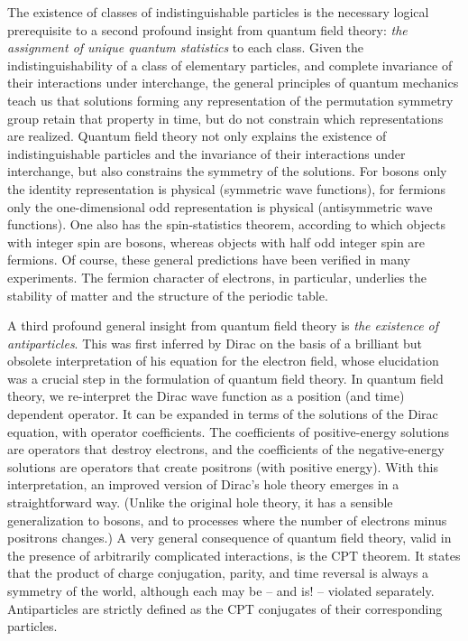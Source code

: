 \documentclass[12pt]{article}
\begin{document}
The existence of
classes of indistinguishable particles is the necessary logical
prerequisite to a second profound insight from quantum field theory:
{\it the assignment of unique quantum statistics\/} to each class.
Given the indistinguishability of a class of
elementary particles, and complete invariance of their interactions
under interchange, the general principles of quantum mechanics teach
us that solutions forming any representation of the permutation
symmetry group retain that property in time, but do not constrain
which representations are realized.  Quantum field theory not only
explains the existence of indistinguishable particles and the
invariance of their interactions under interchange, but also
constrains the symmetry of the solutions.  For bosons only the
identity representation is physical (symmetric wave functions), for
fermions only the one-dimensional odd representation is physical
(antisymmetric wave functions).  One also has the spin-statistics
theorem, according to which objects with integer spin are bosons,
whereas objects with half odd integer spin are fermions.  Of course,
these general predictions have been verified in many experiments.  The
fermion character of electrons, in particular, underlies the stability
of matter and the structure of the periodic table.  

A third profound
general insight from quantum field theory is {\it the existence of
antiparticles}.  This was first inferred by Dirac on the basis of a
brilliant but obsolete interpretation of his equation for the electron
field, whose elucidation was a crucial step in the formulation of
quantum field theory.   In quantum field theory, we re-interpret the Dirac wave
function as a position (and time) dependent operator.  It can be
expanded in terms of the solutions of the Dirac equation, with
operator coefficients.  The coefficients of positive-energy solutions
are operators that destroy electrons, and the coefficients of the
negative-energy solutions are operators that create positrons (with
positive energy).  With this interpretation, an improved version of
Dirac's hole theory 
emerges in a straightforward way. (Unlike the original hole theory,
it has
a sensible generalization to bosons, and to
processes where the number of electrons minus positrons changes.)
A very general consequence of
quantum field theory, valid in the presence of arbitrarily complicated
interactions, is the CPT theorem.  It states that the product of
charge conjugation, parity, and time reversal is always a symmetry of
the world, although each may be -- and is! -- violated separately.
Antiparticles are strictly defined as the CPT conjugates of their
corresponding particles.  
\end{document}
